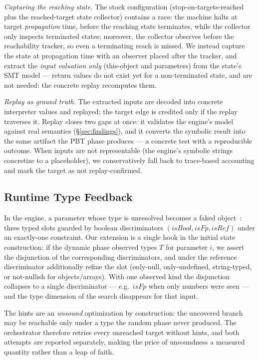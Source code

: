 \documentclass[sigconf,nonacm,screen]{acmart}
\begin{document}
\emph{Capturing the reaching state.} The stock configuration
(stop-on-targets-reached plus the reached-target state collector) contains
a race: the machine halts at target \emph{propagation} time, before the
reaching state terminates, while the collector only inspects terminated
states; moreover, the collector observes before the reachability tracker,
so even a terminating reach is missed. We instead capture the state at
propagation time with an observer placed after the tracker, and extract
the \emph{input valuation only} (this-object and parameters) from the
state's SMT model --- return values do not exist yet for a non-terminated
state, and are not needed: the concrete replay recomputes them.

\emph{Replay as ground truth.} The extracted inputs are decoded into
concrete interpreter values and replayed; the target edge is credited only
if the replay traverses it. Replay closes two gaps at once: it validates
the engine's model against real semantics (\S\ref{sec:findings}), and it
converts the symbolic result into the same artifact the PBT phase produces
--- a concrete test with a reproducible outcome. When inputs are not
representable (the engine's symbolic strings concretize to a placeholder),
we conservatively fall back to trace-based accounting and mark the target
as not replay-confirmed.

\subsection{Runtime Type Feedback}
\label{sec:hints}

In the engine, a parameter whose type is unresolved becomes a faked
object~\cite{menshutin2025}: three typed slots guarded by boolean
discriminators $(\mathit{isBool}, \mathit{isFp}, \mathit{isRef})$ under an
exactly-one constraint. Our extension is a single hook in the initial state
construction: if the dynamic phase observed types $T$ for parameter $i$,
we assert the disjunction of the corresponding discriminators, and under
the reference discriminator additionally refine the slot (only-null,
only-undefined, string-typed, or not-nullish for objects/arrays). With one
observed kind the disjunction collapses to a single discriminator --- e.g.\
$\mathit{isFp}$ when only numbers were seen --- and the type dimension of
the search disappears for that input.

The hints are an \emph{unsound} optimization by construction: the uncovered
branch may be reachable only under a type the random phase never produced.
The orchestrator therefore retries every unreached target without hints,
and both attempts are reported separately, making the price of unsoundness
a measured quantity rather than a leap of faith.
\end{document}
